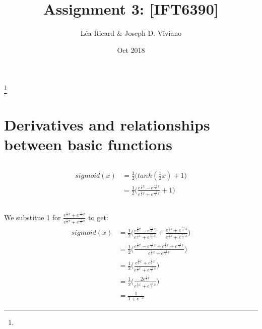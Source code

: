 \documentclass[reqno]{amsart}
\theoremstyle{definition}
\theoremstyle{remark}
\numberwithin{equation}{section}
\begin{document}
\title{Assignment 3: [IFT6390]}

\author{L\'ea Ricard \& Joseph D. Viviano}
\address{Universit\'e de Montr\'eal}
\curraddr{}
\thanks{}
\date{Oct 2018}

\maketitle
\section{Derivatives and relationships between basic functions}

\subsection{}
\begin{align}
    sigmoid(x) &= \frac{1}{2} \Bigg( tanh(\frac{1}{2}x) + 1 \Bigg) \\
    &= \frac{1}{2} \Bigg(\frac{ e^{\frac{1}{2}x} - e^{\frac{-1}{2}x}}{ e^{\frac{1}{2}x} + e^{\frac{-1}{2}x} } + 1 \Bigg) \\
\end{align} \\

We substitue 1 for $\frac{ e^{\frac{1}{2}x} + e^{\frac{-1}{2}x}}{ e^{\frac{1}{2}x} + e^{\frac{-1}{2}x} }$ to get: \\

\begin{align}
    sigmoid(x) &= \frac{1}{2} \Bigg(\frac{ e^{\frac{1}{2}x} - e^{\frac{-1}{2}x}}{ e^{\frac{1}{2}x} + e^{\frac{-1}{2}x} } + 
                                    \frac{ e^{\frac{1}{2}x} + e^{\frac{-1}{2}x}}{ e^{\frac{1}{2}x} + e^{\frac{-1}{2}x} } \Bigg) \\
               &= \frac{1}{2} \Bigg(\frac{ e^{\frac{1}{2}x} - e^{\frac{-1}{2}x} + e^{\frac{1}{2}x} + e^{\frac{-1}{2}x} }{ e^{\frac{1}{2}x} + e^{\frac{-1}{2}x} } \Bigg) \\
               &= \frac{1}{2} \Bigg(\frac{ e^{\frac{1}{2}x} + e^{\frac{1}{2}x} }{ e^{\frac{1}{2}x} + e^{\frac{-1}{2}x} } \Bigg) \\
               &= \frac{1}{2} \Bigg(\frac{ 2 e^{\frac{1}{2}x} }{ e^{\frac{1}{2}x} + e^{\frac{-1}{2}x} } \Bigg) \\
               &= \frac{ 1 }{ 1 + e^{-x} }
\end{align}
\end{document}
